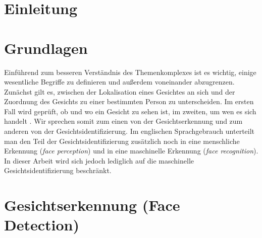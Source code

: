 \documentclass[doktyp=semarbeit, sprache=german]{TUBAFarbeiten}
\begin{document}
\maketitle
\tableofcontents
\newpage
\section{Einleitung}
\section{Grundlagen}
Einführend zum besseren Verständnis des Themenkomplexes ist es wichtig, einige wesentliche Begriffe zu definieren und außerdem voneinander abzugrenzen. Zunächst gilt es, zwischen der Lokalisation eines Gesichtes an sich und der Zuordnung des Gesichts zu einer bestimmten Person zu unterscheiden. Im ersten Fall wird geprüft, ob und wo ein Gesicht zu sehen ist, im zweiten, um wen es sich handelt \cite{FaceRecognitionWikipedia}. Wir sprechen somit zum einen von der Gesichtserkennung und zum anderen von der Gesichtsidentifizierung. Im englischen Sprachgebrauch unterteilt man den Teil der Gesichtsidentifizierung zusätzlich noch in eine menschliche Erkennung (\textit{face perception}) und in eine maschinelle Erkennung (\textit{face recognition}). In dieser Arbeit wird sich jedoch lediglich auf die maschinelle Gesichtsidentifizierung beschränkt.
\section{Gesichtserkennung (Face Detection)}
\end{document}

